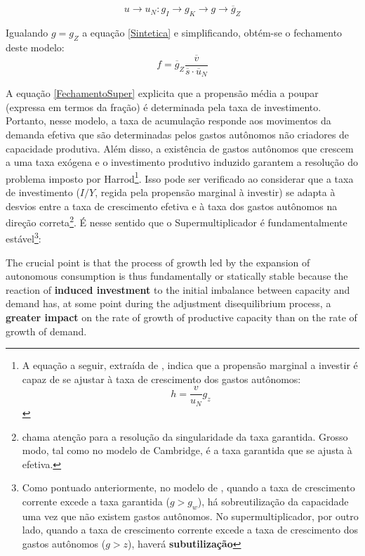 $$
u \to u_N : g_I \to g_K \to g \to \overline g_Z
$$

Igualando $g = g_Z$ a equação \ref{Sintetica} e simplificando, obtém-se o fechamento deste modelo:
\begin{equation}
    \label{FechamentoSuper}
    f = \overline g_Z\frac{\overline v}{\overline s\cdot \overline u_N}
\end{equation}

A equação \ref{FechamentoSuper} explicita que a propensão média a poupar (expressa em termos da fração) é determinada pela taxa de investimento.
Portanto, nesse modelo, a taxa de acumulação responde aos movimentos da demanda efetiva que são determinadas pelos gastos autônomos não criadores de capacidade produtiva. Além disso, a existência de gastos autônomos que crescem a uma taxa exógena e o investimento produtivo induzido garantem a resolução do problema imposto por Harrod\footnote{A equação a seguir, extraída de \textcite{serrano_sraffian_2017}, indica que a propensão marginal a investir é capaz de se ajustar à taxa de crescimento dos gastos autônomos:
$$
h = \frac{v}{u_N}g_z
$$
}. Isso pode ser verificado ao considerar que a taxa de investimento ($I/Y$, regida pela propensão marginal à investir) se adapta à desvios entre a taxa de crescimento efetiva e à taxa dos gastos autônomos na direção correta\footnote{\textcite{cesaratto_neo-kaleckian_2015} chama atenção para a resolução da singularidade da taxa garantida. Grosso modo, tal como no modelo de Cambridge, é a taxa garantida que se ajusta à efetiva.}. 
É nesse sentido que o Supermultiplicador é fundamentalmente estável\footnote{
Como pontuado anteriormente, no modelo de \textcite{harrod_essay_1939}, quando a taxa de crescimento corrente excede a taxa garantida ($g > g_w$), há sobreutilização da capacidade uma vez que não existem gastos autônomos. No supermultiplicador, por outro lado, quando a taxa de crescimento corrente excede a taxa de crescimento dos gastos autônomos ($g > z$), haverá \textbf{subutilização}}:

\begin{citacao}
The crucial point is that the process of growth led by the expansion of autonomous consumption is thus fundamentally or statically stable because the reaction of \textbf{induced investment} to the initial imbalance between capacity and demand has, at some point during the adjustment disequilibrium process, a \textbf{greater impact} on the rate of growth of productive capacity than on the rate of growth of demand. \cite[p.~19, grifos adicionados]{serrano_trouble_2017}
\end{citacao}


